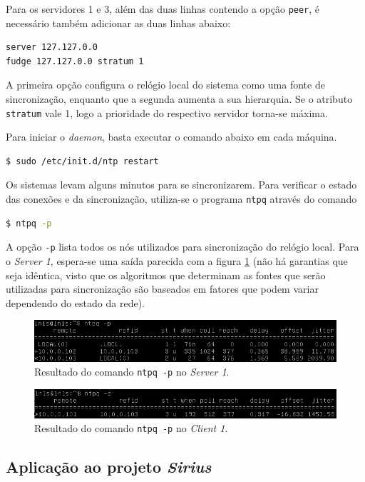 \vspace{12pt}

Para os servidores 1 e 3, além das duas linhas contendo a opção \texttt{peer}, é
necessário também adicionar as duas linhas abaixo:

\begin{lstlisting}[language=bash, style=nonumbers]
server 127.127.0.0
fudge 127.127.0.0 stratum 1
\end{lstlisting}

A primeira opção configura o relógio local do sistema como uma fonte de
sincronização, enquanto que a segunda aumenta a sua hierarquia. Se o
atributo \texttt{stratum} vale 1, logo a prioridade do respectivo servidor
torna-se máxima.

\vspace{12pt}

Para iniciar o \textit{daemon}, basta executar o comando abaixo em cada máquina.

\begin{lstlisting}[language=bash, style=nonumbers]
$ sudo /etc/init.d/ntp restart
\end{lstlisting}

Os sistemas levam alguns minutos para se sincronizarem. Para verificar o estado
das conexões e da sincronização, utiliza-se o programa \texttt{ntpq} através do
comando 

\begin{lstlisting}[language=bash, style=nonumbers]
$ ntpq -p
\end{lstlisting}

A opção \texttt{-p} lista todos os nós utilizados para sincronização do relógio
local. Para o \textit{Server 1}, espera-se uma saída parecida com a figura
\ref{fig:sv1} (não há garantias que seja idêntica, visto que os algoritmos que
determinam as fontes que serão utilizadas para sincronização são baseados em
fatores que podem variar dependendo do estado da rede). 

\FloatBarrier

\begin{figure}[h]
    
    \centering
    \includegraphics[scale=0.7]{image/server1_screen}
    \caption {Resultado do comando \texttt{ntpq -p} no \textit{Server 1}.}
    \label{fig:sv1} 
\end{figure} 

\FloatBarrier

\FloatBarrier

\begin{figure}[h]
    
    \centering
    \includegraphics[scale=0.7]{image/client1_screen}
    \caption {Resultado do comando \texttt{ntpq -p} no \textit{Client 1}.}
    \label{fig:cl1}  
\end{figure} 

\FloatBarrier
\subsection {Aplicação ao projeto \textit{Sirius}}